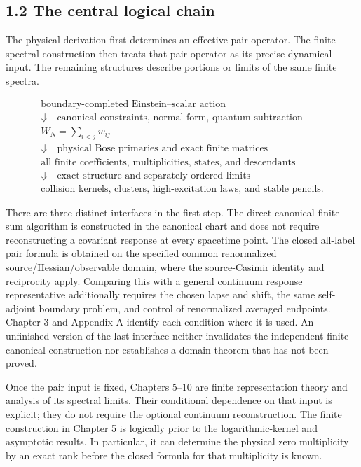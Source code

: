 \hypertarget{the-central-logical-chain}{%
\subsection{1.2 The central logical chain}\label{the-central-logical-chain}}

The physical derivation first determines an effective pair operator. The finite spectral construction then treats that pair operator as its precise dynamical input. The remaining structures describe portions or limits of the same finite spectra.

\[
\begin{gathered}
\text{boundary-completed Einstein--scalar action}\\
\Downarrow\quad\text{canonical constraints, normal form, quantum subtraction}\\
W_N=\displaystyle\sum_{i<j}w_{ij}\\
\Downarrow\quad\text{physical Bose primaries and exact finite matrices}\\
\text{all finite coefficients, multiplicities, states, and descendants}\\
\Downarrow\quad\text{exact structure and separately ordered limits}\\
\text{collision kernels, clusters, high-excitation laws, and stable pencils}.
\end{gathered}
\tag{1.2}
\]

There are three distinct interfaces in the first step. The direct canonical finite-sum algorithm is constructed in the canonical chart and does not require reconstructing a covariant response at every spacetime point. The closed all-label pair formula is obtained on the specified common renormalized source/Hessian/observable domain, where the source-Casimir identity and reciprocity apply. Comparing this with a general continuum response representative additionally requires the chosen lapse and shift, the same self-adjoint boundary problem, and control of renormalized averaged endpoints. Chapter 3 and Appendix A identify each condition where it is used. An unfinished version of the last interface neither invalidates the independent finite canonical construction nor establishes a domain theorem that has not been proved.

Once the pair input is fixed, Chapters 5--10 are finite representation theory and analysis of its spectral limits. Their conditional dependence on that input is explicit; they do not require the optional continuum reconstruction. The finite construction in Chapter 5 is logically prior to the logarithmic-kernel and asymptotic results. In particular, it can determine the physical zero multiplicity by an exact rank before the closed formula for that multiplicity is known.

